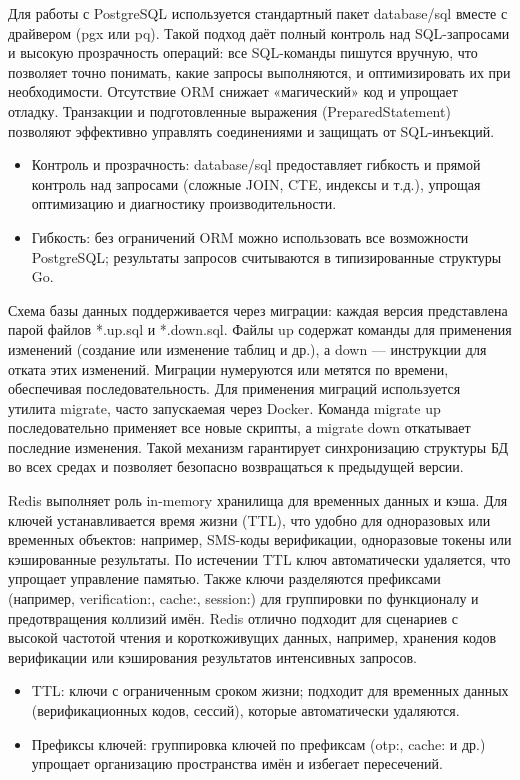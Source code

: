 Для работы с PostgreSQL используется стандартный пакет database/sql вместе с драйвером (pgx или pq). Такой подход даёт полный контроль над SQL-запросами и высокую прозрачность операций: все SQL-команды пишутся вручную, что позволяет точно понимать, какие запросы выполняются, и оптимизировать их при необходимости. Отсутствие ORM снижает «магический» код и упрощает отладку. Транзакции и подготовленные выражения (PreparedStatement) позволяют эффективно управлять соединениями и защищать от SQL-инъекций.

\begin{itemize}
    \item Контроль и прозрачность: database/sql предоставляет гибкость и прямой контроль над запросами (сложные JOIN, CTE, индексы и т.д.), упрощая оптимизацию и диагностику производительности.
    \item Гибкость: без ограничений ORM можно использовать все возможности PostgreSQL; результаты запросов считываются в типизированные структуры Go.
\end{itemize}

\noindent Схема базы данных поддерживается через миграции: каждая версия представлена парой файлов *.up.sql и *.down.sql. Файлы up содержат команды для применения изменений (создание или изменение таблиц и др.), а down — инструкции для отката этих изменений. Миграции нумеруются или метятся по времени, обеспечивая последовательность. Для применения миграций используется утилита migrate, часто запускаемая через Docker. Команда migrate up последовательно применяет все новые скрипты, а migrate down откатывает последние изменения. Такой механизм гарантирует синхронизацию структуры БД во всех средах и позволяет безопасно возвращаться к предыдущей версии.

Redis выполняет роль in-memory хранилища для временных данных и кэша. Для ключей устанавливается время жизни (TTL), что удобно для одноразовых или временных объектов: например, SMS-коды верификации, одноразовые токены или кэшированные результаты. По истечении TTL ключ автоматически удаляется, что упрощает управление памятью. Также ключи разделяются префиксами (например, verification:, cache:, session:) для группировки по функционалу и предотвращения коллизий имён. Redis отлично подходит для сценариев с высокой частотой чтения и короткоживущих данных, например, хранения кодов верификации или кэширования результатов интенсивных запросов.

\begin{itemize}
    \item TTL: ключи с ограниченным сроком жизни; подходит для временных данных (верификационных кодов, сессий), которые автоматически удаляются.
    \item Префиксы ключей: группировка ключей по префиксам (otp:, cache: и др.) упрощает организацию пространства имён и избегает пересечений.
\end{itemize}

